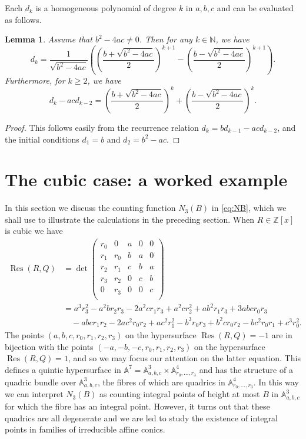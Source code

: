 \documentclass[reqno, 12pt, twoside]{amsart}
\numberwithin{equation}{section}
\DeclareMathOperator{\Res}{Res}
\newcommand{\ZZ}{\mathbb{Z}}
\newcommand{\0}{\mathbf{0}}
\newcommand{\NN}{\mathbb{N}}
\newtheorem{lemma}[theorem]{Lemma}
\theoremstyle{definition}
\renewcommand{\geq}{\geqslant}
\begin{document}
Each $d_k$ is a homogeneous polynomial of degree $k$ in $a,b,c$ and can be evaluated as follows. 


\begin{lemma}\label{lem:res3}
Assume that $b^2-4ac\neq 0$. 
Then for any  $k\in \NN$, we have
\[
d_k=\frac{1}{\sqrt{b^2-4ac}}\left(\left(\frac{b+\sqrt{b^2-4ac}}{2}\right)^{k+1}-\left(\frac{b-\sqrt{b^2-4ac}}{2}\right)^{k+1}\right).
\]
Furthermore, for $k\geq 2$, we have
\[d_k-acd_{k-2}=\left(\frac{b+\sqrt{b^2-4ac}}{2}\right)^{k}+\left(\frac{b-\sqrt{b^2-4ac}}{2}\right)^{k}.\]
\end{lemma}
\begin{proof}
This follows easily from the recurrence relation $d_k=bd_{k-1}-acd_{k-2}$, and the initial conditions $d_{1}=b$ and  $d_2=b^2-ac$.
\end{proof}

\section{The cubic case: a worked example}\label{s:3}

In this section we 
discuss the counting function $N_3(B)$ in \eqref{eq:NB},
which we shall use to 
illustrate the  calculations in the preceding section.
When $R\in \ZZ[x]$ is cubic we have
\begin{align*}
\Res(R,Q)
&=
\det
\begin{pmatrix}
r_0 & 0 & a& 0&  0    \\
r_1 & r_0& b& a& 0    \\
r_2 & r_1& c& b& a   \\
r_3 & r_2& 0& c& b  \\
0 & r_3& 0& 0&  c    \\
\end{pmatrix}\\
&=a^3 r_3^2
-a^2 b r_2 r_3-2 a^2 c r_1 r_3 + a^2 c r_2^2+
a b^2 r_1 r_3 + 3 a b c r_0 r_3 \\
&\quad - a b c r_1 r_2 - 2 a c^2 r_0 r_2 +
a c^2 r_1^2
-b^3 r_0 r_3 + b^2 c r_0 r_2-b c^2 r_0 r_1 + c^3 r_0^2.
\end{align*}
The points $(a,b,c,r_0,r_1,r_2,r_3)$ on the hypersurface
$\Res(R,Q)=-1$ are in bijection with the 
 points $(-a,-b,-c,r_0,r_1,r_2,r_3)$ on the hypersurface 
$\Res(R,Q)=1$, and so we may focus our attention on the latter equation. 
This 
 defines a quintic hypersurface in $\mathbb{A}^7=\mathbb{A}_{a,b,c}^3\times \mathbb{A}_{r_0,\dots,r_3}^4$ and has the structure of a quadric bundle over $\mathbb{A}_{a,b,c}^3$, the fibres of which are quadrics in  $\mathbb{A}_{r_0,\dots,r_3}^4$. In this way we can interpret $N_3(B)$ as counting integral points of height at most $B$ in $\mathbb{A}_{a,b,c}^3$ for which the fibre has 
 an integral point. However, it turns out that these quadrics are all degenerate and we are led to study 
the existence of integral points in families of 
 irreducible affine conics.
\end{document}
